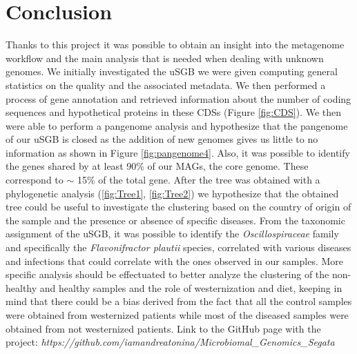 \documentclass[a4paper,titlepage, oneside]{book}
\begin{document}
\chapter{Conclusion}
Thanks to this project it was possible to obtain an insight into the metagenome workflow and the main analysis that is needed when dealing with unknown genomes.
We initially investigated the uSGB we were given computing general statistics on the quality and the associated metadata.
We then performed a process of gene annotation and retrieved information about the number of coding sequences and hypothetical proteins in these CDSs (Figure \ref{fig:CDS}).
We then were able to perform a pangenome analysis and hypothesize that the pangenome of our uSGB is closed as the addition of new genomes gives us little to no information as shown in Figure \ref{fig:pangenome4}. Also, it was possible to identify the genes shared by at least 90\% of our MAGs, the core genome. These correspond to $\sim$ 15\% of the total gene.
After the tree was obtained with a phylogenetic analysis (\ref{fig:Tree1}, \ref{fig:Tree2}) we hypothesize that the obtained tree could be useful to investigate the clustering based on the country of origin of the sample and the presence or absence of specific diseases.
From the taxonomic assignment of the uSGB, it was possible to identify the \textit{Oscillospiraceae} family and specifically the \textit{Flavonifractor plautii} species, correlated with various diseases and infections \cite{HipJoint,PlautiiDiseases, PlautiiBlood} that could correlate with the ones observed in our samples. More specific analysis should be effectuated to better analyze the clustering of the non-healthy and healthy samples and the role of westernization and diet, keeping in mind that there could be a bias derived from the fact that all the control samples were obtained from westernized patients while most of the diseased samples were obtained from not westernized patients.
\vfill
Link to the GitHub page with the project: \textit{https://github.com/iamandreatonina/Microbiomal\_Genomics\_Segata}
\end{document}
